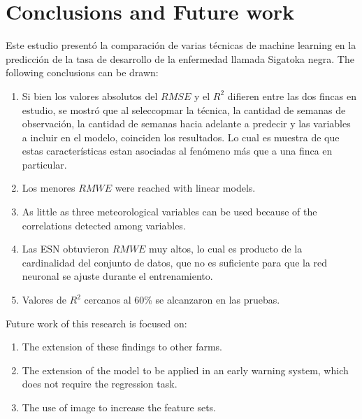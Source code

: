 \section{Conclusions and Future work}
Este estudio presentó la comparación de varias técnicas de machine learning en la predicción de la tasa de desarrollo de la enfermedad llamada Sigatoka negra. The following conclusions can be drawn:
\begin{enumerate}
\item Si bien los valores absolutos del $RMSE$ y el $R^2$ difieren entre las dos fincas en estudio, se mostró que al seleccopmar la técnica, la cantidad de semanas de observación, la cantidad de semanas hacia adelante a predecir y las variables a incluir en el modelo, coinciden los resultados. Lo cual es muestra de que estas características estan asociadas al fenómeno más que a una finca en particular.
\item Los menores $RMWE$ were reached with linear models.
\item  As little as three meteorological variables can be used because of the correlations detected among variables. 
\item Las ESN obtuvieron $RMWE$ muy altos, lo cual es producto de la cardinalidad del conjunto de datos, que no es suficiente para que la red neuronal se ajuste durante el entrenamiento.
\item Valores de $R^2$ cercanos al 60\% se alcanzaron en las pruebas.
\end{enumerate}
%
Future work of this research is focused on:
\begin{enumerate}
\item The extension of these findings to other farms.
\item The extension of the model to be applied in an early warning system, which does not require the regression task.
\item The use of image to increase the feature sets.
\end{enumerate}

